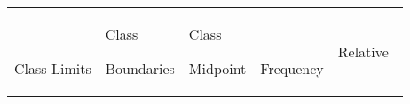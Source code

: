 \documentclass[]{book}
\begin{document}
\begin{longtable}[]{@{}lllll@{}}
\toprule
\endhead
\begin{minipage}[t]{0.18\columnwidth}\raggedright
~

Class Limits\strut
\end{minipage} & \begin{minipage}[t]{0.23\columnwidth}\raggedright
Class

Boundaries\strut
\end{minipage} & \begin{minipage}[t]{0.13\columnwidth}\raggedright
Class

Midpoint\strut
\end{minipage} & \begin{minipage}[t]{0.14\columnwidth}\raggedright
~

Frequency\strut
\end{minipage} & \begin{minipage}[t]{0.14\columnwidth}\raggedright
Relative~


\end{minipage}
\end{longtable}
\end{document}
